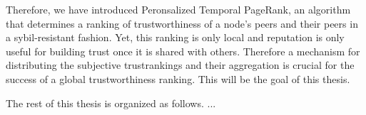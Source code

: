 Therefore, we have introduced Peronsalized Temporal PageRank, an algorithm that determines a 
ranking of trustworthiness of a node's peers and their peers in a sybil-resistant fashion. Yet, 
this ranking is only local and reputation is only useful for building trust once it is shared 
with others. Therefore a mechanism for distributing the subjective trustrankings and their
aggregation is crucial for the success of a global trustworthiness ranking. This will be the 
goal of this thesis. 

The rest of this thesis is organized as follows. ...